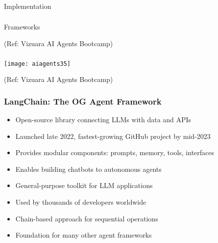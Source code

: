 \begin{frame}[fragile]\frametitle{}
\begin{center}
{\Large Implementation}
\end{center}
\end{frame}

\begin{frame}[fragile]\frametitle{}
\begin{center}
{\Large Frameworks}

{\tiny (Ref: Vizuara AI Agents Bootcamp)}
\end{center}
\end{frame}


\begin{frame}[fragile]\frametitle{}

\begin{center}
\texttt{[image: aiagents35]}

{\tiny (Ref: Vizuara AI Agents Bootcamp)}
\end{center}	
  
\end{frame}

\begin{frame}[fragile]\frametitle{LangChain: The OG Agent Framework}
      \begin{itemize}
	  \item Open-source library connecting LLMs with data and APIs
	  \item Launched late 2022, fastest-growing GitHub project by mid-2023
	  \item Provides modular components: prompts, memory, tools, interfaces
	  \item Enables building chatbots to autonomous agents
	  \item General-purpose toolkit for LLM applications
	  \item Used by thousands of developers worldwide
	  \item Chain-based approach for sequential operations
	  \item Foundation for many other agent frameworks
	  \end{itemize}
\end{frame}

